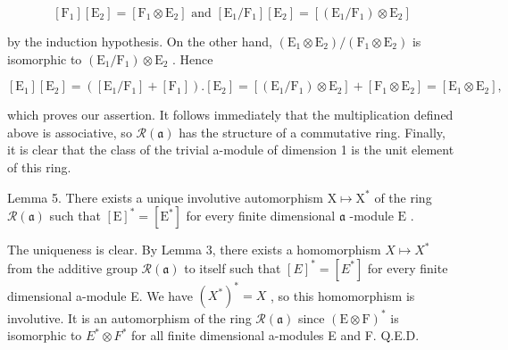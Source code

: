 \[
[ \mathrm{F} _ {1} ] [ \mathrm{E} _ {2} ] = [ \mathrm{F} _ {1} \otimes \mathrm{E} _ {2} ] \text { and } [ \mathrm{E} _ {1} / \mathrm{F} _ {1} ] [ \mathrm{E} _ {2} ] = [ (\mathrm{E} _ {1} / \mathrm{F} _ {1}) \otimes \mathrm{E} _ {2} ]
\]

by the induction hypothesis. On the other hand, \((\mathrm{E}_1\otimes \mathrm{E}_2) / (\mathrm{F}_1\otimes \mathrm{E}_2)\) is isomorphic to \((\mathrm{E}_1 / \mathrm{F}_1)\otimes \mathrm{E}_2\) . Hence

\[
[ \mathrm{E} _ {1} ] [ \mathrm{E} _ {2} ] = ([ \mathrm{E} _ {1} / \mathrm{F} _ {1} ] + [ \mathrm{F} _ {1} ]). [ \mathrm{E} _ {2} ] = [ (\mathrm{E} _ {1} / \mathrm{F} _ {1}) \otimes \mathrm{E} _ {2} ] + [ \mathrm{F} _ {1} \otimes \mathrm{E} _ {2} ] = [ \mathrm{E} _ {1} \otimes \mathrm{E} _ {2} ],
\]

which proves our assertion. It follows immediately that the multiplication defined above is associative, so \(\mathcal{R}(\mathfrak{a})\) has the structure of a commutative ring. Finally, it is clear that the class of the trivial a-module of dimension 1 is the unit element of this ring.

Lemma 5. There exists a unique involutive automorphism \(\mathrm{X} \mapsto \mathrm{X}^*\) of the ring \(\mathcal{R}(\mathfrak{a})\) such that \([\mathrm{E}]^* = [\mathrm{E}^*]\) for every finite dimensional \(\mathfrak{a}\) -module \(\mathrm{E}\) .

The uniqueness is clear. By Lemma 3, there exists a homomorphism \(X \mapsto X^{*}\) from the additive group \(\mathcal{R}(\mathfrak{a})\) to itself such that \([E]^{*} = [E^{*}]\) for every finite dimensional a-module E. We have \((X^{*})^{*} = X\) , so this homomorphism is involutive. It is an automorphism of the ring \(\mathcal{R}(\mathfrak{a})\) since \((\mathrm{E} \otimes \mathrm{F})^{*}\) is isomorphic to \(E^{*} \otimes F^{*}\) for all finite dimensional a-modules E and F. Q.E.D.

